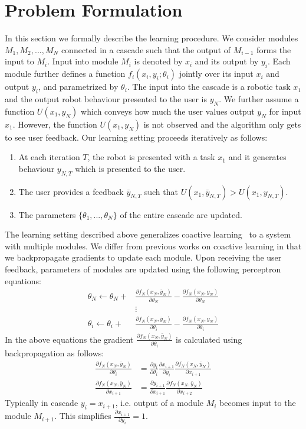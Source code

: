 \section{Problem Formulation}
In this section we formally describe the learning procedure. We consider modules $M_1,M_2,...,M_N$ connected in a cascade such that the output of $M_{i-1}$ forms the input to $M_i$. Input into  module $M_i$ is denoted by $x_i$ and its output by $y_i$. Each module further defines a function $f_i(x_i,y_i;\theta_i)$ jointly over its input $x_i$ and output $y_i$, and parametrized by $\theta_i$. The input into the cascade is a robotic task $x_1$ and the output robot behaviour presented to the user is $y_N$. 
We further assume a function $U(x_1,y_N)$ which conveys how much the user values output $y_N$ for input $x_1$. However, the function $U(x_1,y_N)$ is not observed and the algorithm only gets to see user feedback. Our learning setting proceeds iteratively as follows:
\begin{enumerate}
\item At each iteration $T$, the robot is presented with a task $x_1$ and it generates behaviour $y_{N,T}$ which is presented to the user.
\item The user provides a feedback $\bar{y}_{N,T}$ such that $U(x_1,\bar{y}_{N,T}) > U(x_1,{y}_{N,T})$.
\item The parameters $\{\theta_1,...,\theta_N\}$ of the entire cascade are updated.
\end{enumerate} 

The learning setting described above generalizes coactive learning~\citep{Jain13,Shivaswamy12} to a system with multiple modules. We differ from previous works on coactive learning in that we backpropagate gradients to update each module. Upon receiving the user feedback, parameters of modules are updated using the following perceptron equations:  
\begin{align}
\theta_N \leftarrow \theta_N +  &\frac{\partial f_N(x_N,\bar{y}_N)}{\partial \theta_N} - \frac{\partial f_N(x_N,{y}_N)}{\partial \theta_N}\\
 &\vdots\\
\theta_i \leftarrow \theta_i +  &\frac{\partial f_N(x_N,\bar{y}_N)}{\partial \theta_i} - \frac{\partial f_N(x_N,{y}_N)}{\partial \theta_i}
\end{align}
In the above equations the	 gradient $\frac{\partial f_N(x_N,\bar{y}_N)}{\partial \theta_i}$ is calculated using backpropagation as follows:
\begin{align}
\frac{\partial f_N(x_N,\bar{y}_N)}{\partial \theta_i} &= \frac{\partial y_i}{\partial \theta_i} \frac{\partial x_{i+1}}{\partial y_i} \frac{\partial f_N(x_N,\bar{y}_N)	}{\partial x_{i+1}}\\
\frac{\partial f_N(x_N,\bar{y}_N)	}{\partial x_{i+1}} &= \frac{\partial y_{i+1}	}{\partial x_{i+1}} \frac{\partial f_N(x_N,\bar{y}_N)	}{\partial x_{i+2}}
\end{align}   
Typically in cascade $y_i = x_{i+1}$, i.e. output of a module $M_i$ becomes input to the module $M_{i+1}$. This simplifies $\frac{\partial x_{i+1}}{\partial y_i} = 1$.